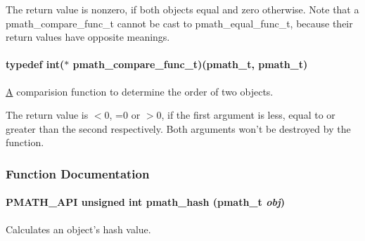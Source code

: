 The return value is nonzero, if both objects equal and zero otherwise. Note that a pmath\_\-compare\_\-func\_\-t cannot be cast to pmath\_\-equal\_\-func\_\-t, because their return values have opposite meanings. \hypertarget{group__objects_g9180e6d1f4ba84b77ea71414ce57677f}{
\paragraph[{pmath\_\-compare\_\-func\_\-t}]{\setlength{\rightskip}{0pt plus 5cm}typedef int($\ast$ {\bf pmath\_\-compare\_\-func\_\-t})({\bf pmath\_\-t}, {\bf pmath\_\-t})}\hfill}
\label{group__objects_g9180e6d1f4ba84b77ea71414ce57677f}


\hyperlink{class_a}{A} comparision function to determine the order of two objects. 

The return value is $<$0, =0 or $>$0, if the first argument is less, equal to or greater than the second respectively. Both arguments won't be destroyed by the function. 

\subsubsection{Function Documentation}
\hypertarget{group__objects_g9413cfb0b3fd00d361046189853a11d8}{
\paragraph[{pmath\_\-hash}]{\setlength{\rightskip}{0pt plus 5cm}PMATH\_\-API unsigned int pmath\_\-hash ({\bf pmath\_\-t} {\em obj})}\hfill}
\label{group__objects_g9413cfb0b3fd00d361046189853a11d8}


Calculates an object's hash value. 

